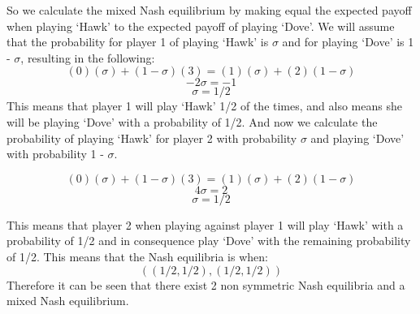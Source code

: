\documentclass{book}
\begin{document}
So we calculate the mixed Nash equilibrium by making equal the expected payoff  when playing `Hawk' to the expected payoff of playing `Dove'. We will assume that the probability for player 1 of playing `Hawk' is $\sigma$ and for playing `Dove' is 1 - $\sigma$, resulting in the following:
\begin{equation}
(0)(\sigma) + (1 - \sigma)(3) = (1)(\sigma) + (2)(1 - \sigma)
\end{equation}
\begin{equation}
-2 \sigma = -1
\end{equation}
\begin{equation}
\sigma = 1/2
\end{equation}
This means that player 1 will play `Hawk' 1/2 of the times, and also means she will be playing `Dove' with a probability of 1/2. And now we calculate the probability of playing `Hawk' for player 2 with probability $\sigma$ and playing `Dove' with probability 1 - $\sigma$.

\begin{equation}
(0)(\sigma) + (1 - \sigma)(3) = (1)(\sigma) + (2)(1 - \sigma)
\end{equation}
\begin{equation}
4 \sigma = 2
\end{equation}
\begin{equation}
\sigma = 1/2
\end{equation}

This means that player 2 when playing against player 1 will play `Hawk' with a probability of  1/2  and in consequence play `Dove' with the remaining probability of 1/2. 
This means that the Nash equilibria is when:
\begin{equation}
((1/2, 1/2), (1/2, 1/2))
\end{equation}
Therefore it can be seen that there exist 2 non symmetric Nash equilibria and a mixed Nash equilibrium.
\end{document}
